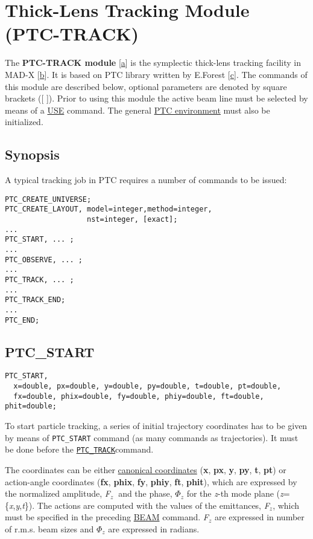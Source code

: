 

\chapter{Thick-Lens Tracking Module (PTC-TRACK)}

The \textbf{PTC-TRACK module }[\hyperlink{V._Kapin}{a}] is the
symplectic thick-lens tracking facility in MAD-X
[\hyperlink{F._Schmidt}{b}]. It is based on PTC library written by
E.Forest [\hyperlink{E._Forest}{c}]. The commands of this module are
described below, optional parameters are denoted by square brackets ([
]). Prior to using this module the active beam line must be selected by
means of a \href{../control/general.html#use}{USE} command.  
The general \href{../ptc_general/ptc_general.html}{PTC environment} must
also be initialized.  

\section{Synopsis}

A typical tracking job in PTC requires a number of commands to be issued:

\begin{verbatim}
PTC_CREATE_UNIVERSE;
PTC_CREATE_LAYOUT, model=integer,method=integer, 
                   nst=integer, [exact];
...
PTC_START, ... ;
...
PTC_OBSERVE, ... ;
...
PTC_TRACK, ... ;
...
PTC_TRACK_END;
...
PTC_END;
\end{verbatim}

\section{PTC\_START}

\begin{verbatim}
PTC_START,  
  x=double, px=double, y=double, py=double, t=double, pt=double,
  fx=double, phix=double, fy=double, phiy=double, ft=double, phit=double; 
\end{verbatim}

To start particle tracking, a series of initial trajectory coordinates
has to be given by means of \texttt{PTC\_START} command (as many
commands as trajectories). It must be done before the
\texttt{\hyperlink{PTC_TRACK}{PTC\_TRACK}}command. 

The coordinates can be either
\href{../Introduction/tables.html#canon}{canonical  coordinates}
(\textbf{x}, \textbf{px}, \textbf{y}, \textbf{py},
\textbf{t}, \textbf{pt}) 
or action-angle coordinates (\textbf{fx}, \textbf{phix}, 
\textbf{fy}, \textbf{phiy}, \textbf{ft}, \textbf{phit}), which 
are expressed by the normalized amplitude, \textit{F}$_\textit{z }$ and
the phase,  \textit{$\Phi$}$_\textit{z}$ for the \textit{z}-th mode
plane  (\textit{z}=\{\textit{x},\textit{y},\textit{t}\}). 
The actions are computed with the values of the emittances,
\textit{F}$_\textit{z}$, which must be specified in the preceding 
\href{../Introduction/beam.html}{BEAM} command. \textit{F}$_\textit{z}$
are expressed in number of r.m.s. beam sizes and
\textit{$\Phi$}$_\textit{z}$  are expressed in radians.


